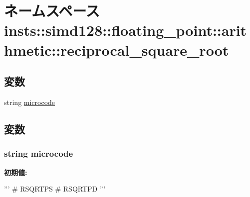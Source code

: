 \hypertarget{namespaceinsts_1_1simd128_1_1floating__point_1_1arithmetic_1_1reciprocal__square__root}{
\section{ネームスペース insts::simd128::floating\_\-point::arithmetic::reciprocal\_\-square\_\-root}
\label{namespaceinsts_1_1simd128_1_1floating__point_1_1arithmetic_1_1reciprocal__square__root}
}
\subsection*{変数}
\begin{DoxyCompactItemize}
\item 
string \hyperlink{namespaceinsts_1_1simd128_1_1floating__point_1_1arithmetic_1_1reciprocal__square__root_a770f11a173e99389a8802f0107ed8f52}{microcode}
\end{DoxyCompactItemize}


\subsection{変数}
\hypertarget{namespaceinsts_1_1simd128_1_1floating__point_1_1arithmetic_1_1reciprocal__square__root_a770f11a173e99389a8802f0107ed8f52}{
\subsubsection[{microcode}]{\setlength{\rightskip}{0pt plus 5cm}string {\bf microcode}}}
\label{namespaceinsts_1_1simd128_1_1floating__point_1_1arithmetic_1_1reciprocal__square__root_a770f11a173e99389a8802f0107ed8f52}
{\bfseries 初期値:}
\begin{DoxyCode}
'''
# RSQRTPS
# RSQRTPD
'''
\end{DoxyCode}
